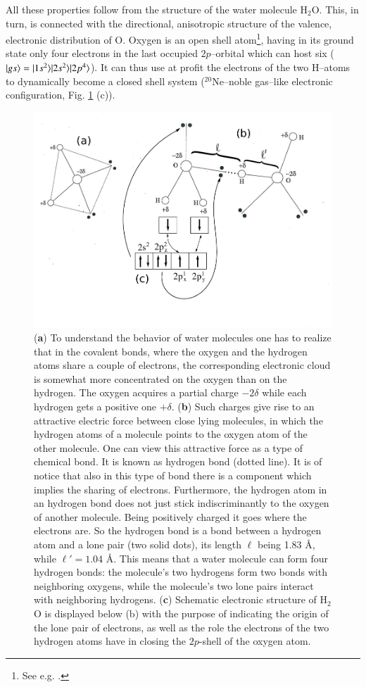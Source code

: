 \begin{subappendices}
All these properties follow from the structure of the water molecule H$_2$O. This, in turn, is connected with the directional, anisotropic structure of the valence, electronic distribution of O. Oxygen is an open shell atom\footnote{See e.g. \cite{Greiner:98}.}, having in its ground state only four electrons in the last occupied $2p$--orbital which can host six ($|{gs} \rangle=|{1s^2} \rangle|{2s^2} \rangle|{2p^4} \rangle$). It can thus use at profit the electrons of the two H--atoms to dynamically become a closed shell system ($^{20}$Ne--noble gas--like electronic configuration, Fig. \ref{fig6G5} (c)). 
\begin{figure}
\centerline{\includegraphics[width=13cm]{C8/figsC8/fig6G5.pdf}}
\caption{(\textbf{a}) To understand the behavior of water molecules one has to realize that in the covalent bonds, where the oxygen and the hydrogen atoms share a couple of electrons, the corresponding electronic cloud is somewhat more concentrated on the oxygen than on the hydrogen. The oxygen acquires a partial charge $-2\delta$ while each hydrogen gets a positive one $+\delta$. (\textbf{b}) Such charges give rise to an attractive electric force between  close lying molecules, in which the hydrogen atoms of a molecule points to the oxygen atom of the other molecule. One can view this attractive force as a type of chemical bond. It is known as hydrogen bond (dotted line). It is of notice that also in this type of bond there is a component which implies the sharing of electrons. Furthermore, the hydrogen atom in an hydrogen bond does not just stick indiscriminantly to the  oxygen of another molecule. Being positively charged it goes where the electrons are. So the hydrogen bond is a bond between a hydrogen atom and a lone pair (two solid dots), its length $\ell$ being 1.83 \AA, while $\ell'=1.04$ \AA. This means that a water molecule can form four hydrogen bonds: the molecule's two hydrogens form two bonds with neighboring oxygens, while the molecule's two lone pairs interact with neighboring hydrogens. (\textbf{c}) Schematic electronic structure of H$_2$O is displayed below (b) with the purpose of indicating  the origin of the lone pair of electrons, as well as the role the electrons of the two hydrogen atoms have in closing the $2p$-shell of the oxygen atom.}\label{fig6G5}

\end{figure}
\end{subappendices}
